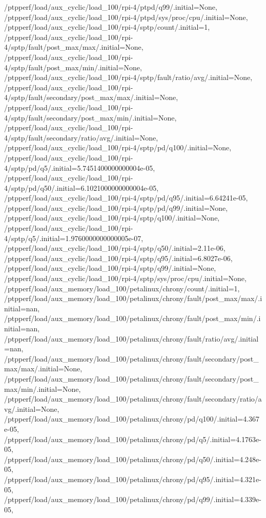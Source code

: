 {    /ptpperf/load/aux_cyclic/load_100/rpi-4/ptpd/q99/.initial=None,
    /ptpperf/load/aux_cyclic/load_100/rpi-4/ptpd/sys/proc/cpu/.initial=None,
    /ptpperf/load/aux_cyclic/load_100/rpi-4/sptp/count/.initial=1,
    /ptpperf/load/aux_cyclic/load_100/rpi-4/sptp/fault/post_max/max/.initial=None,
    /ptpperf/load/aux_cyclic/load_100/rpi-4/sptp/fault/post_max/min/.initial=None,
    /ptpperf/load/aux_cyclic/load_100/rpi-4/sptp/fault/ratio/avg/.initial=None,
    /ptpperf/load/aux_cyclic/load_100/rpi-4/sptp/fault/secondary/post_max/max/.initial=None,
    /ptpperf/load/aux_cyclic/load_100/rpi-4/sptp/fault/secondary/post_max/min/.initial=None,
    /ptpperf/load/aux_cyclic/load_100/rpi-4/sptp/fault/secondary/ratio/avg/.initial=None,
    /ptpperf/load/aux_cyclic/load_100/rpi-4/sptp/pd/q100/.initial=None,
    /ptpperf/load/aux_cyclic/load_100/rpi-4/sptp/pd/q5/.initial=5.7451400000000004e-05,
    /ptpperf/load/aux_cyclic/load_100/rpi-4/sptp/pd/q50/.initial=6.1021000000000004e-05,
    /ptpperf/load/aux_cyclic/load_100/rpi-4/sptp/pd/q95/.initial=6.64241e-05,
    /ptpperf/load/aux_cyclic/load_100/rpi-4/sptp/pd/q99/.initial=None,
    /ptpperf/load/aux_cyclic/load_100/rpi-4/sptp/q100/.initial=None,
    /ptpperf/load/aux_cyclic/load_100/rpi-4/sptp/q5/.initial=1.9760000000000005e-07,
    /ptpperf/load/aux_cyclic/load_100/rpi-4/sptp/q50/.initial=2.11e-06,
    /ptpperf/load/aux_cyclic/load_100/rpi-4/sptp/q95/.initial=6.8027e-06,
    /ptpperf/load/aux_cyclic/load_100/rpi-4/sptp/q99/.initial=None,
    /ptpperf/load/aux_cyclic/load_100/rpi-4/sptp/sys/proc/cpu/.initial=None,
    /ptpperf/load/aux_memory/load_100/petalinux/chrony/count/.initial=1,
    /ptpperf/load/aux_memory/load_100/petalinux/chrony/fault/post_max/max/.initial=nan,
    /ptpperf/load/aux_memory/load_100/petalinux/chrony/fault/post_max/min/.initial=nan,
    /ptpperf/load/aux_memory/load_100/petalinux/chrony/fault/ratio/avg/.initial=nan,
    /ptpperf/load/aux_memory/load_100/petalinux/chrony/fault/secondary/post_max/max/.initial=None,
    /ptpperf/load/aux_memory/load_100/petalinux/chrony/fault/secondary/post_max/min/.initial=None,
    /ptpperf/load/aux_memory/load_100/petalinux/chrony/fault/secondary/ratio/avg/.initial=None,
    /ptpperf/load/aux_memory/load_100/petalinux/chrony/pd/q100/.initial=4.367e-05,
    /ptpperf/load/aux_memory/load_100/petalinux/chrony/pd/q5/.initial=4.1763e-05,
    /ptpperf/load/aux_memory/load_100/petalinux/chrony/pd/q50/.initial=4.248e-05,
    /ptpperf/load/aux_memory/load_100/petalinux/chrony/pd/q95/.initial=4.321e-05,
    /ptpperf/load/aux_memory/load_100/petalinux/chrony/pd/q99/.initial=4.339e-05,
}
